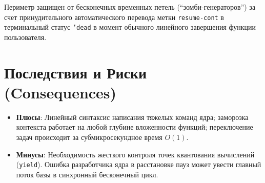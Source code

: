\documentclass[12pt,a4paper]{article}
\begin{document}
Периметр защищен от бесконечных временных петель (``зомби-генераторов'') за счет принудительного автоматического перевода метки \texttt{resume-cont} в терминальный статус \texttt{'dead} в момент обычного линейного завершения функции пользователя.

\section{Последствия и Риски (Consequences)}
\begin{itemize}
    \item \textbf{Плюсы}: Линейный синтаксис написания тяжелых команд ядра; заморозка контекста работает на любой глубине вложенности функций; переключение задач происходит за субмикросекундное время $O(1)$.
    \item \textbf{Минусы}: Необходимость жесткого контроля точек квантования вычислений (\texttt{yield}). Ошибка разработчика ядра в расстановке пауз может увести главный поток базы в синхронный бесконечный цикл.
\end{itemize}
\end{document}
